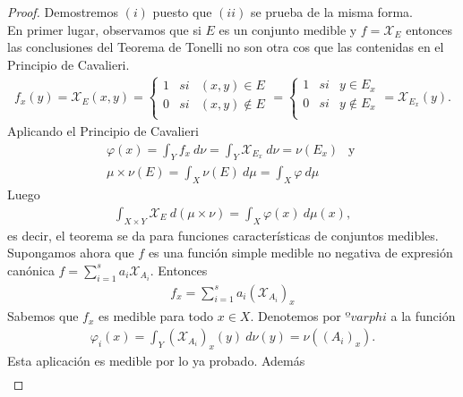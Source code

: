 \begin{proof}
Demostremos $(i)$ puesto que $(ii)$ se prueba de la misma forma.
\\
\newline
En primer lugar, observamos que si $E$ es un conjunto medible y $f = \mathcal{X}_E$ entonces las conclusiones del Teorema de Tonelli no son otra cos que las contenidas en el Principio de Cavalieri.
\begin{align*}
    f_x(y) = \mathcal{X}_E(x,y) = \left\{ \begin{array}{lcc}
             1 &  si  & (x,y) \in E\\
            0&  si  &  (x,y) \not \in E\\
             \end{array}
        \right. = \left\{ \begin{array}{lcc}
             1 &  si  & y \in E_x\\
            0&  si  &  y \not \in E_x\\
             \end{array}
        \right. = \mathcal{X}_{E_x}(y).
\end{align*}
Aplicando el Principio de Cavalieri
\begin{align*}
    \varphi(x) = \int_{Y}{f_x \ d\nu} = \int_{Y}{\mathcal{X}_{E_x} \ d\nu} = \nu(E_x) \ \ \text{ y } \\
    \mu \times \nu (E) = \int_{X}{\nu(E) \ d\mu} = \int_{X}{\varphi \ d\mu}
\end{align*}
Luego
\begin{align*}
    \int_{X \times Y}{\mathcal{X}_E \ d(\mu \times \nu)} = \int_{X}{ \varphi(x) \ d\mu(x)},
\end{align*}
es decir, el teorema se da para funciones características de conjuntos medibles.
\\
\newline
Supongamos ahora que $f$ es una función simple medible no negativa de expresión canónica $f = \sum_{i=1}^{s}{a_i\mathcal{X}_{A_i}}$. Entonces
\begin{align*}
    f_x = \sum_{i=1}^{s}{a_i(\mathcal{X}_{A_i})_x}
\end{align*}
Sabemos que $f_x$ es medible para todo $x \in X$. Denotemos por $ºvarphi$ a la función
\begin{align*}
    \varphi_i(x) = \int_{Y}{(\mathcal{X}_{A_i})_x(y) \ d\nu(y)} = \nu((A_i)_x).
\end{align*}
Esta aplicación es medible por lo ya probado. Además
\begin{align*}

\end{align*}
\end{proof}

